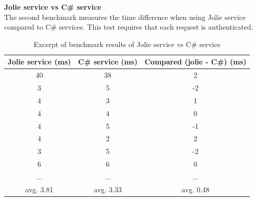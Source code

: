 \documentclass[12pt,a4paper]{article}
\begin{document}
\newpage
\textbf{Jolie service vs C\# service}\\
The second benchmark measures the time difference when using Jolie service compared to C\# services. This test requires that each request is authenticated.
\begin{table}[h!]
\begin{center}
\begin{tabular}{ | c | c | c | }
\hline
Jolie service (ms) & C\# service (ms) & Compared (jolie - C\#) (ms) \\ \hline
 40  &  38  &   2  \\ \hline                                                                                                                                                                                 
  3  &   5  &  -2  \\ \hline                                                                                                                                                                                 
  4  &   3  &   1  \\ \hline                                                                                                                                                                                 
  4  &   4  &   0  \\ \hline                                                                                                                                                                                 
  4  &   5  &  -1  \\ \hline                                                                                                                                                                                 
  4  &   2  &   2  \\ \hline                                                                                                                                                                                 
  3  &   5  &  -2  \\ \hline                                                                                                                                                                                 
  6  &   6  &   0  \\ \hline
  ... & ... & ... \\ \hline
  avg. 3.81 & avg. 3.33 & avg. 0.48 \\ \hline 
\end{tabular}
\label{table:jolieVsWindows}
\caption{Excerpt of benchmark results of Jolie service vs C\# service }
\end{center}
\end{table}
\end{document}
